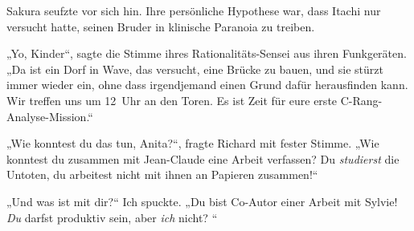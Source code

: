 Sakura seufzte vor sich hin. Ihre persönliche Hypothese war, dass Itachi nur versucht hatte, seinen Bruder in klinische Paranoia zu treiben.

„Yo, Kinder“, sagte die Stimme ihres Rationalitäts-Sensei aus ihren Funkgeräten. „Da ist ein Dorf in Wave, das versucht, eine Brücke zu bauen, und sie stürzt immer wieder ein, ohne dass irgendjemand einen Grund dafür herausfinden kann. Wir treffen uns um 12~Uhr an den Toren. Es ist Zeit für eure erste C-Rang-Analyse-Mission.“

\clearpage
{}


„Wie konntest du das tun, Anita?“, fragte Richard mit fester Stimme. „Wie konntest du zusammen mit Jean-Claude eine Arbeit verfassen? Du \emph{studierst} die Untoten, du arbeitest nicht mit ihnen an Papieren zusammen!“

„Und was ist mit dir?“ Ich spuckte. „Du bist Co-Autor einer Arbeit mit Sylvie! \emph{Du} darfst produktiv sein, aber \emph{ich} nicht? “

